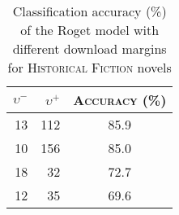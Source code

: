 \begin{table}[htb]
    \caption{Classification accuracy (\%) of the Roget model with different download margins for \textsc{Historical Fiction} novels}
    \label{tab:hist fict roget margins}
    \begin{tabular}{rrc}
        \centering
        $\upsilon^-$ & $\upsilon^+$ & \textsc{Accuracy (\%)} \\
        \hline
        13 & 112 & 85.9 \\
        10 & 156 & 85.0 \\
        18 & 32 & 72.7 \\
        12 & 35 & 69.6 \\
        \hline
    \end{tabular}
\end{table}